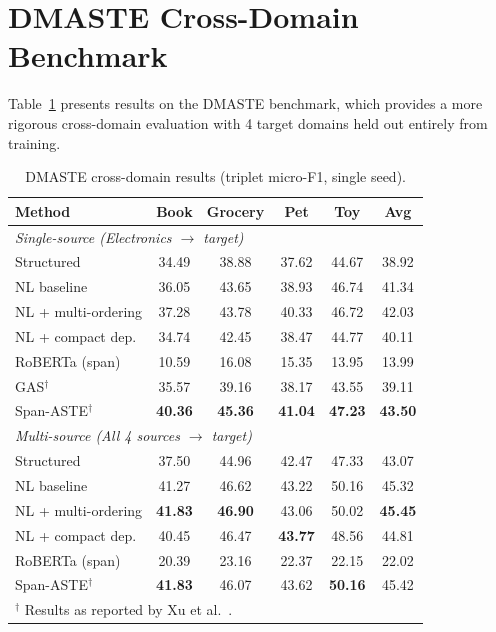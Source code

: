 \documentclass[12pt,a4paper]{report}
\begin{document}
\section{DMASTE Cross-Domain Benchmark}\label{sec:dmaste}

Table~\ref{tab:dmaste} presents results on the DMASTE benchmark, which provides a more rigorous cross-domain evaluation with 4 target domains held out entirely from training.

\begin{table}[H]
\centering
\caption{DMASTE cross-domain results (triplet micro-F1, single seed).}
\label{tab:dmaste}
\small
\begin{tabular}{@{}lccccc@{}}
\toprule
\textbf{Method} & \textbf{Book} & \textbf{Grocery} & \textbf{Pet} & \textbf{Toy} & \textbf{Avg} \\
\midrule
\multicolumn{6}{l}{\textit{Single-source (Electronics $\rightarrow$ target)}} \\
\midrule
Structured & 34.49 & 38.88 & 37.62 & 44.67 & 38.92 \\
NL baseline & 36.05 & 43.65 & 38.93 & 46.74 & 41.34 \\
NL + multi-ordering & 37.28 & 43.78 & 40.33 & 46.72 & 42.03 \\
NL + compact dep. & 34.74 & 42.45 & 38.47 & 44.77 & 40.11 \\
RoBERTa (span) & 10.59 & 16.08 & 15.35 & 13.95 & 13.99 \\
\midrule
GAS$^\dagger$~\cite{zhang2021towards} & 35.57 & 39.16 & 38.17 & 43.55 & 39.11 \\
Span-ASTE$^\dagger$~\cite{xu2021learning} & \textbf{40.36} & \textbf{45.36} & \textbf{41.04} & \textbf{47.23} & \textbf{43.50} \\
\midrule
\multicolumn{6}{l}{\textit{Multi-source (All 4 sources $\rightarrow$ target)}} \\
\midrule
Structured & 37.50 & 44.96 & 42.47 & 47.33 & 43.07 \\
NL baseline & 41.27 & 46.62 & 43.22 & 50.16 & 45.32 \\
NL + multi-ordering & \textbf{41.83} & \textbf{46.90} & 43.06 & 50.02 & \textbf{45.45} \\
NL + compact dep. & 40.45 & 46.47 & \textbf{43.77} & 48.56 & 44.81 \\
RoBERTa (span) & 20.39 & 23.16 & 22.37 & 22.15 & 22.02 \\
\midrule
Span-ASTE$^\dagger$~\cite{xu2021learning} & \textbf{41.83} & 46.07 & 43.62 & \textbf{50.16} & 45.42 \\
\bottomrule
\multicolumn{6}{l}{\small $^\dagger$ Results as reported by Xu et al.~\cite{xu2023dmaste}.}
\end{tabular}
\end{table}
\end{document}
